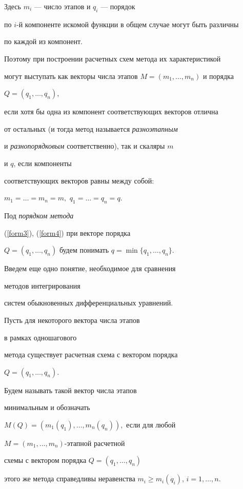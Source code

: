 Здесь $m_{i}$ --- число этапов и $q_{i}$ --- порядок 


по $i$-й компоненте искомой функции в общем случае могут быть различны


по каждой из компонент.


Поэтому при построении расчетных схем метода их характеристикой


могут выступать как векторы числа этапов $M=(m_1,\dotsc,m_n)$ и порядка


$Q=(q_1,\dotsc,q_n)$,


если хотя бы одна из компонент соответствующих векторов отлична


от остальных (и тогда метод называется {\it разноэтапным}


и {\it разнопорядковым} соответственно), так и скаляры $m$


и $q$, если компоненты


соответствующих векторов равны между собой:


$m_1=\dotsc=m_n=m,$ $q_1=\dotsc=q_n=q$.





Под {\it порядком метода}


(\ref{form3}), (\ref{form4}) при векторе порядка


$Q=(q_1,\dotsc,q_n)$ будем понимать $q=\min\{q_1,\dotsc,q_n\}$.


\par Введем еще одно понятие, необходимое для сравнения


методов интегрирования


систем обыкновенных дифференциальных уравнений.





\begin{defnnonum}


Пусть для некоторого вектора числа этапов


в рамках одношагового


метода существует расчетная схема с вектором порядка 


$Q=(q_1,\dotsc,q_n)$.


Будем называть такой вектор числа этапов


минимальным и обозначать


$M(Q)=(m_1(q_1),\dotsc,m_n(q_n)),$ если для любой


$M=(m_1,\dotsc,m_n)$-этапной расчетной


схемы с вектором порядка $Q=(q_1,\dotsc,q_n)$


этого же метода справедливы неравенства $m_i\geq m_i(q_i)$, $i=1,\dotsc,n$.


\end{defnnonum}





